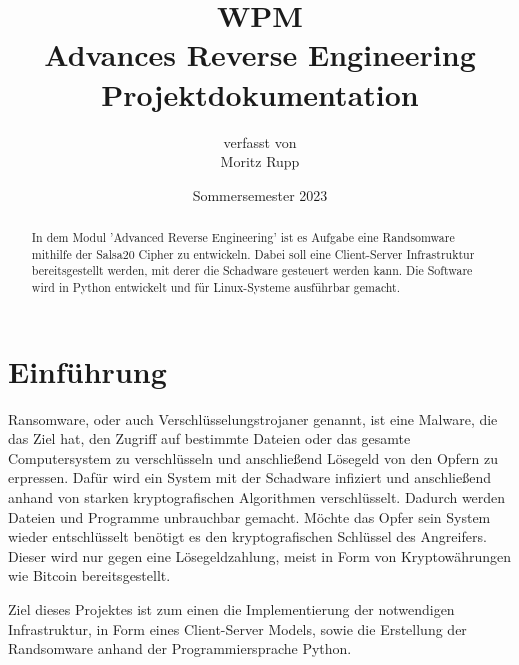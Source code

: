 \documentclass[12pt]{article}
\title{\small{WPM}\\\vspace{3mm}\Large{Advances Reverse Engineering\\\small{Projektdokumentation}}}
\author{ \small{verfasst von}\\ Moritz Rupp}
\date{Sommersemester 2023}
\begin{document}
\maketitle
\newpage
\tableofcontents
\newpage

\begin{abstract}
\noindent In dem Modul 'Advanced Reverse Engineering' ist es Aufgabe eine Randsomware mithilfe der Salsa20 Cipher zu entwickeln. Dabei soll eine Client-Server Infrastruktur bereitsgestellt werden, mit derer die Schadware gesteuert werden kann. Die Software wird in Python entwickelt und für Linux-Systeme ausführbar gemacht.
\end{abstract}
\section{Einführung}
Ransomware, oder auch Verschlüsselungstrojaner genannt, ist eine Malware, die das Ziel hat, den Zugriff auf bestimmte Dateien oder das gesamte Computersystem  zu verschlüsseln und anschließend Lösegeld von den Opfern zu erpressen. Dafür wird ein System mit der Schadware infiziert und anschließend anhand von starken kryptografischen Algorithmen verschlüsselt. Dadurch werden Dateien und Programme unbrauchbar gemacht. Möchte das Opfer sein System wieder entschlüsselt benötigt es den kryptografischen Schlüssel des Angreifers. Dieser wird nur gegen eine Lösegeldzahlung, meist in Form von Kryptowährungen wie Bitcoin bereitsgestellt. 
\newline


Ziel dieses Projektes ist zum einen die Implementierung der notwendigen Infrastruktur, in Form eines Client-Server Models, sowie die Erstellung der Randsomware anhand der Programmiersprache Python.

																					
\end{document}
